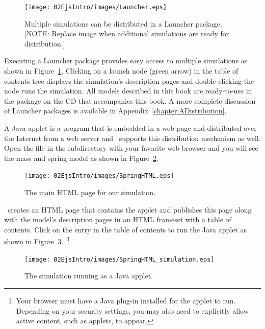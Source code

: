 \begin{figure}[htb]
    \centering
  \texttt{[image: 02EjsIntro/images/Launcher.eps]}
    \caption{Multiple simulations can be distributed in a Launcher package. [NOTE: Replace image when additional simulations are ready for distribution.]}
    \label{fig:02EjsIntro/Launcher}
\end{figure}

Executing a Launcher package provides easy access to multiple simulations as shown in Figure~\ref{fig:02EjsIntro/Launcher}.  Clicking on a launch node (green arrow) in the table of contents tree displays the simulation's description pages and double clicking the node runs the simulation.  All models described in this book are ready-to-use in the  package on the CD that accompanies this book.  A more complete discussion of Launcher packages is available in Appendix~\ref{chapter:ADistribution}.

A Java applet is a program that is embedded in a web page and distributed over the Internet from a web server and \Ejs\ supports this distribution mechanism as well. Open the  file in the  subdirectory with your favorite web browser and you will see the mass and spring model as shown in Figure~\ref{fig:02EjsIntro/SpringHTML}.

\begin{figure}[htb]
    \centering
  \texttt{[image: 02EjsIntro/images/SpringHTML.eps]}
    \caption{The main HTML page for our simulation. }
    \label{fig:02EjsIntro/SpringHTML}
\end{figure}

\ejs\ creates an HTML page that contains the applet and publishes this page along with the model's description pages in an HTML frameset with a table of contents. Click on the  entry in the table of contents to run the Java applet as shown in Figure~\ref{fig:02EjsIntro/SpringHTML_simulation}.~\footnote{Your browser must have a Java plug-in installed for the applet to run. Depending on your security settings, you may also need to explicitly allow active content, such as applets, to appear.}

\begin{figure}[htb]
    \centering
  \texttt{[image: 02EjsIntro/images/SpringHTML\_simulation.eps]}
    \caption{The simulation running as a Java applet. }
    \label{fig:02EjsIntro/SpringHTML_simulation}
\end{figure}

